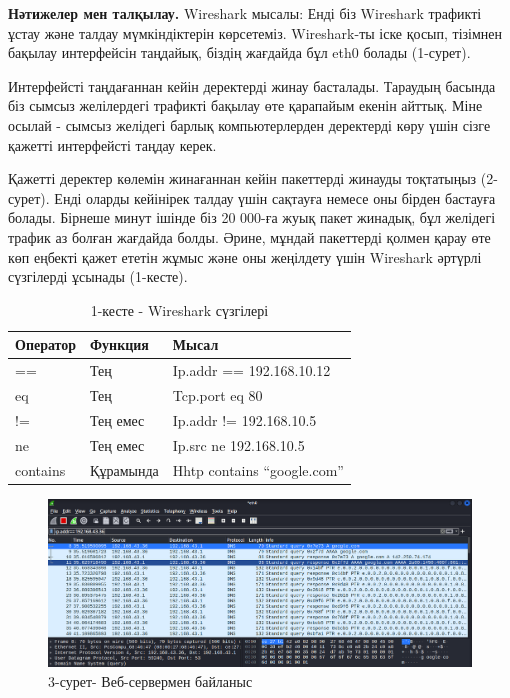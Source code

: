 \begin{multicols}{2}
{\bfseries Нәтижелер мен талқылау.} Wireshark мысалы: Енді біз Wireshark
трафикті ұстау және талдау мүмкіндіктерін көрсетеміз. Wireshark-ты іске
қосып, тізімнен бақылау интерфейсін таңдайық, біздің жағдайда бұл eth0
болады (1-сурет).

Интерфейсті таңдағаннан кейін деректерді жинау басталады. Тараудың
басында біз сымсыз желілердегі трафикті бақылау өте қарапайым екенін
айттық. Міне осылай - сымсыз желідегі барлық компьютерлерден деректерді
көру үшін сізге қажетті интерфейсті таңдау керек.

Қажетті деректер көлемін жинағаннан кейін пакеттерді жинауды тоқтатыңыз
(2-сурет). Енді оларды кейінірек талдау үшін сақтауға немесе оны бірден
бастауға болады. Бірнеше минут ішінде біз 20 000-ға жуық пакет жинадық,
бұл желідегі трафик аз болған жағдайда болды. Әрине, мұндай пакеттерді
қолмен қарау өте көп еңбекті қажет ететін жұмыс және оны жеңілдету үшін
Wireshark әртүрлі сүзгілерді ұсынады (1-кесте).
\end{multicols}

\begin{table}[H]
\caption*{1-кесте - Wireshark сүзгілері}
\centering
\begin{tabular}{|l|l|l|}
\hline
Оператор & Функция & Мысал \\ \hline
== & Тең & Ip.addr == 192.168.10.12 \\ \hline
eq & Тең & Tcp.port eq 80 \\ \hline
!= & Тең емес & Ip.addr != 192.168.10.5 \\ \hline
ne & Тең емес & Ip.src ne 192.168.10.5 \\ \hline
contains & Құрамында & Hhtp contains “google.com” \\ \hline
\end{tabular}
\end{table}


\begin{figure}[H]
	\centering
	\includegraphics[width=\textwidth]{assets/28}
	\caption*{3-сурет- Веб-сервермен байланыс}
\end{figure}

